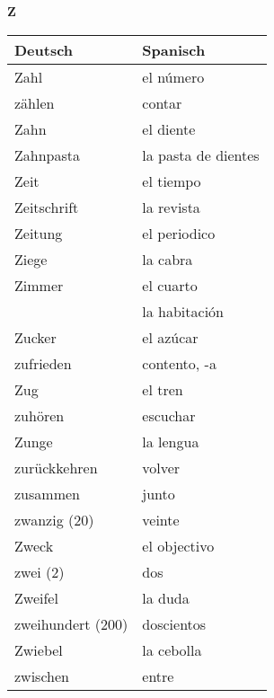 \begin{flushright}\begin{Huge}\textbf{Z}\end{Huge}\end{flushright}

\begin{longtable}{p{} p{}} 
\textbf{Deutsch}     & \textbf{Spanisch}                                       \\ \hline
\hline
\endhead %
Zahl & el número \\
zählen & contar\\
Zahn & el diente\\
Zahnpasta & la pasta de dientes\\
Zeit & el tiempo\\
Zeitschrift & la revista\\
Zeitung & el periodico \\
Ziege & la cabra\\
Zimmer & el cuarto\\
~ & la habitación\\
Zucker & el azúcar\\
zufrieden & contento, -a\\
Zug & el tren\\
zuhören & escuchar\\
Zunge & la lengua\\
zurückkehren & volver\\
zusammen & junto\\
zwanzig (20) & veinte\\
Zweck & el objectivo\\
zwei (2) & dos\\
Zweifel & la duda\\
zweihundert (200) & doscientos\\
Zwiebel & la cebolla\\
zwischen & entre\\

\end{longtable}
